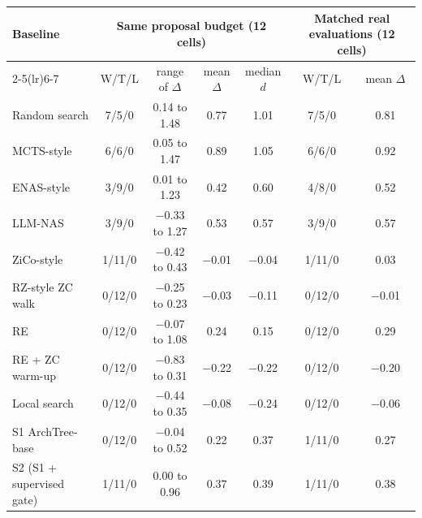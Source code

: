 \begin{tabular}{@{}lcccccc@{}}
\toprule
\multirow{2}{*}{Baseline} & \multicolumn{4}{c}{Same proposal budget (12 cells)} & \multicolumn{2}{c}{Matched real evaluations (12 cells)}\\
\cmidrule(lr){2-5}\cmidrule(lr){6-7}
 & W/T/L & range of $\Delta$ & mean $\Delta$ & median $d$ & W/T/L & mean $\Delta$\\
\midrule
Random search & 7/5/0 & 0.14 to 1.48 & 0.77 & 1.01 & 7/5/0 & 0.81\\
MCTS-style & 6/6/0 & 0.05 to 1.47 & 0.89 & 1.05 & 6/6/0 & 0.92\\
ENAS-style & 3/9/0 & 0.01 to 1.23 & 0.42 & 0.60 & 4/8/0 & 0.52\\
LLM-NAS & 3/9/0 & $-$0.33 to 1.27 & 0.53 & 0.57 & 3/9/0 & 0.57\\
ZiCo-style & 1/11/0 & $-$0.42 to 0.43 & $-$0.01 & $-$0.04 & 1/11/0 & 0.03\\
RZ-style ZC walk & 0/12/0 & $-$0.25 to 0.23 & $-$0.03 & $-$0.11 & 0/12/0 & $-$0.01\\
RE & 0/12/0 & $-$0.07 to 1.08 & 0.24 & 0.15 & 0/12/0 & 0.29\\
RE + ZC warm-up & 0/12/0 & $-$0.83 to 0.31 & $-$0.22 & $-$0.22 & 0/12/0 & $-$0.20\\
Local search & 0/12/0 & $-$0.44 to 0.35 & $-$0.08 & $-$0.24 & 0/12/0 & $-$0.06\\
S1 ArchTree-base & 0/12/0 & $-$0.04 to 0.52 & 0.22 & 0.37 & 1/11/0 & 0.27\\
S2 (S1 + supervised gate) & 1/11/0 & 0.00 to 0.96 & 0.37 & 0.39 & 1/11/0 & 0.38\\
\bottomrule
\end{tabular}
